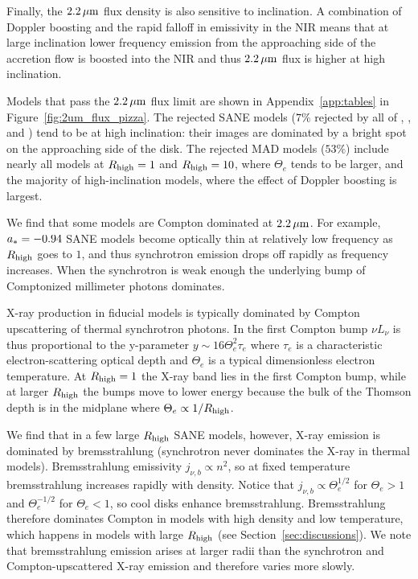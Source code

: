 Finally, the $2.2\,\mu\mathrm{m}$ flux density is also sensitive to inclination.  A combination of Doppler boosting and the rapid falloff in emissivity in the NIR means that at large inclination lower frequency emission from the approaching side of the accretion flow is boosted into the NIR and thus $2.2\,\mu\mathrm{m}$ flux is higher at high inclination.

Models that pass the $2.2\,\mu\mathrm{m}$ flux limit are shown in Appendix~\ref{app:tables} in Figure~\ref{fig:2um_flux_pizza}.
The rejected SANE models ($7\%$ rejected by all of \kharma, \bhac, and \hamr) tend to be at high inclination: their images are dominated by a bright spot on the approaching side of the disk.
The rejected MAD models ($53\%$) include nearly all models at $R_\mathrm{high} = 1$ and $R_\mathrm{high} = 10$, where $\Theta_e$ tends to be larger, and the majority of high-inclination models, where the effect of Doppler boosting is largest.

We find that some models are Compton dominated at $2.2\,\mu\mathrm{m}$.
For example, $a_* = -0.94$ SANE models become optically thin at relatively low frequency as $R_\mathrm{high}$ goes to $1$, and thus synchrotron emission drops off rapidly as frequency increases.  When the synchrotron is weak enough the underlying bump of Comptonized millimeter photons dominates.


X-ray production in fiducial models is typically dominated by Compton upscattering of thermal synchrotron photons.
In the first Compton bump $\nu L_\nu$ is thus proportional to the y-parameter $y \sim 16 \Theta_e^2 \tau_e$ where $\tau_e$ is a characteristic electron-scattering optical depth and $\Theta_e$ is a typical dimensionless electron temperature.
At $R_\mathrm{high} = 1$ the X-ray band lies in the first Compton bump, while at larger $R_\mathrm{high}$ the bumps move to lower energy because the bulk of the Thomson depth is in the midplane where $\Theta_e \propto 1/R_\mathrm{high}$.

We find that in a few large $R_\mathrm{high}$ SANE models, however, X-ray emission is dominated by bremsstrahlung (synchrotron never dominates the X-ray in thermal models).  Bremsstrahlung emissivity $j_{\nu,b} \propto n^2$, so at fixed temperature bremsstrahlung increases rapidly with density. Notice that $j_{\nu,b} \propto \Theta_e^{1/2}$ for $\Theta_e > 1$ and $\Theta_e^{-1/2}$ for $\Theta_e < 1$, so cool disks enhance bremsstrahlung.  Bremsstrahlung therefore dominates Compton in models with high density and low temperature, which happens in models with large $R_\mathrm{high}$ (see Section~\ref{sec:discussions}).  We note that bremsstrahlung emission arises at larger radii than the synchrotron and Compton-upscattered X-ray emission and therefore varies more slowly.


